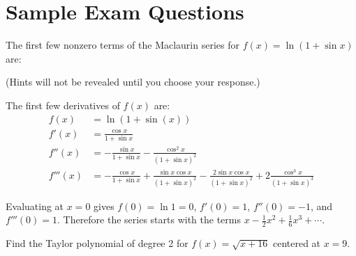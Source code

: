 \documentclass{ximera}
\begin{document}
\section*{Sample Exam Questions}

\begin{question}%

The first few nonzero terms of the Maclaurin series for \(f(x) = \ln ( 1 + \sin x)\) are:
\begin{multiplechoice}
\end{multiplechoice}
(Hints will not be revealed until you choose your response.)
\begin{feedback}
The first few derivatives of \(f(x)\) are:
\[\begin{aligned}
f(x) & = \ln (1 + \sin(x)) \\
f'(x) & = \frac{ \cos x}{1 + \sin x} \\
f''(x) & = - \frac{\sin x}{1 + \sin x} - \frac{\cos^2 x}{(1 + \sin x)^2} \\
f'''(x) & = - \frac{\cos x}{1 + \sin x} + \frac{\sin x \cos x}{(1 + \sin x)^2} - \frac{2 \sin x \cos x}{(1 + \sin x)^2} + 2 \frac{\cos^3 x}{(1 + \sin x)^3}
\end{aligned}\]
\begin{hint}
Evaluating at \(x = 0\) gives \(f(0) = \ln 1 = 0\), \(f'(0) = 1\), \(f''(0) = -1\), and \(f'''(0) = 1\). Therefore the series starts with the terms \(x - \frac{1}{2} x^2 + \frac{1}{6} x^3 + \cdots\).
\end{hint}
\end{feedback}

\end{question}

\begin{question}%

Find the Taylor polynomial of degree 2 for \(f(x) = \sqrt{x+16}\) centered at \(x=9\).
\begin{multiplechoice}
\end{multiplechoice}

\end{question}
\end{document}
